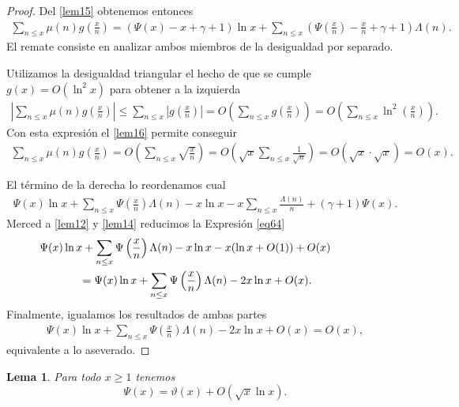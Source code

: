 \documentclass[10pt]{article}
\newtheorem{lemma}[theorem]{Lema}
\theoremstyle{definition}
\theoremstyle{remark}
\begin{document}
\begin{proof}
Del \cref{lem15} obtenemos entonces 
\begin{align}
\sum_{n \leq x} \mu(n) g\left(\frac{x}{n}\right) = 
(\Psi(x) - x + \gamma + 1) \ln x + \sum_{n \leq x} \left(\Psi\left(\frac{x}{n}\right) - \frac{x}{n} + \gamma + 1\right) \Lambda(n). 
\end{align}
El remate consiste en analizar ambos miembros de la desigualdad por separado. 

Utilizamos la desigualdad triangular el hecho de que se cumple $g(x) = O(\ln^2 x)$ para obtener a la izquierda 
\begin{align}
\left | \sum_{n \leq x} \mu(n) g\left(\frac{x}{n}\right) \right|  \leq \sum_{n \leq x} \left| g\left(\frac{x}{n}\right) \right| 
= O\left(\sum_{n \leq x} g\left(\frac{x}{n}\right)\right) 
= O\left(\sum_{n \leq x} \ln^2 \left(\frac{x}{n}\right)\right).
\end{align}
Con esta expresi\'on el \cref{lem16} permite conseguir
\begin{align}
\sum_{n \leq x} \mu(n) g\left(\frac{x}{n}\right) = O\left(\sum_{n \leq x} \sqrt{\frac{x}{n}}\right) 
= O\left(\sqrt{x} \sum_{n \leq x} \frac{1}{\sqrt{n}}\right) = O\left( \sqrt{x}\cdot \sqrt{x}\right)=O(x). 
\end{align}

El t\'ermino de la derecha lo reordenamos cual 
\begin{align}
 \Psi(x)\ln x + \sum_{n \leq x} \Psi\left(\frac{x}{n}\right)\Lambda(n) - x \ln x - x \sum_{n \leq x} \frac{\Lambda(n)}{n} + (\gamma + 1)\Psi(x).\label{eq64}
\end{align}
Merced a \cref{lem12} y \cref{lem14} reducimos la Expresi\'on \ref{eq64}
\begin{align}
& \hskip -0.5in  \Psi(x)\ln x + \sum_{n \leq x} \Psi\left(\frac{x}{n}\right)\Lambda(n) - x \ln x - x(\ln x + O(1)) + O(x)\\
&= \Psi(x)\ln x + \sum_{n \leq x} \Psi\left(\frac{x}{n}\right)\Lambda(n) - 2x \ln x + O(x).
\end{align}
Finalmente, igualamos los resultados de ambas partes
\begin{align}
\Psi(x)\ln x + \sum_{n \leq x} \Psi\left(\frac{x}{n}\right)\Lambda(n) - 2x \ln x + O(x) = O(x), 
\end{align}
equivalente a lo aseverado. 
\end{proof}

\begin{lemma}\label{lem18}
Para todo $x \geq 1$ tenemos
\[
\Psi(x) = \vartheta(x) + O(\sqrt{x}\ln x).
\]
\end{lemma}
\end{document}
